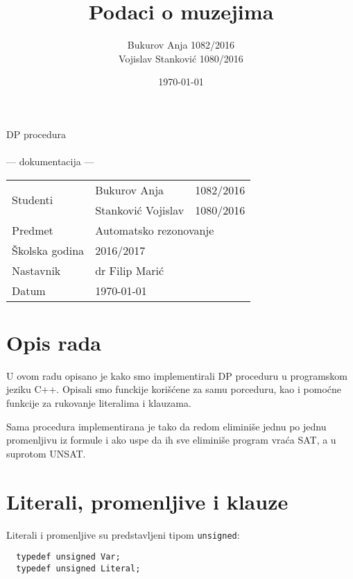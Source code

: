 \documentclass[a4paper, 12pt]{article}
\author{Bukurov Anja 1082/2016\\Vojislav Stanković 1080/2016}
\title{Podaci o muzejima}
\date{\today}
\begin{document}
\begin{titlepage}
	\centering
	
	\vspace{0.3\textheight}
	
	{\Huge DP procedura}
	\\~
	\\
	{\Large — dokumentacija —}
	
	\vfill
	
	{
		\Large 
		\begin{tabular}{|l|l|l|}
			\hline
			\multirow{2}{*}{Studenti} & Bukurov Anja        & 1082/2016\\ \cline{2-3}
			                          & Stanković Vojislav 	& 1080/2016\\
			\hline
			Predmet                   & \multicolumn{2}{l|}{Automatsko rezonovanje}\\
			\hline
			Školska godina         & \multicolumn{2}{l|}{2016/2017}\\
			\hline
			Nastavnik                 & \multicolumn{2}{l|}{dr Filip Marić}\\
			\hline
			Datum                     & \multicolumn{2}{l|}{\today}\\
			\hline
		\end{tabular}
	}
\end{titlepage}
\newpage

\section{Opis rada}

U ovom radu opisano je kako smo implementirali DP proceduru u programskom jeziku C++. Opisali smo funckije korišćene za samu porceduru, kao i pomoćne funkcije za rukovanje literalima i klauzama.

Sama procedura implementirana je tako da redom eliminiše jednu po jednu promenljivu iz formule i ako uspe da ih sve eliminiše program vraća SAT, a u suprotom UNSAT.


\section{Literali, promenljive i klauze}

\noindent Literali i promenljive su predstavljeni tipom \verb|unsigned|:

\begin{verbatim}
  typedef unsigned Var;
  typedef unsigned Literal;
\end{verbatim}
\end{document}
